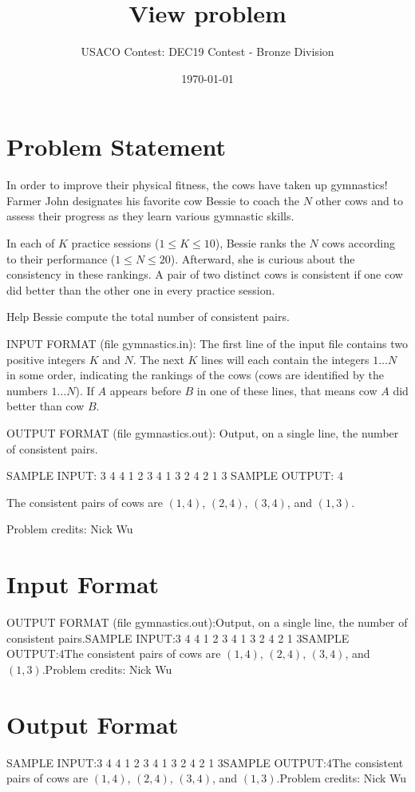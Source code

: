 \documentclass[12pt]{article}
\title{View problem}
\author{USACO Contest: DEC19 Contest - Bronze Division}
\date{\today}
\begin{document}
\maketitle

\section*{Problem Statement}

In order to improve their physical fitness, the cows have taken up gymnastics!
Farmer John designates his favorite cow Bessie to coach the $N$ other cows and
to assess their progress as they learn various gymnastic skills.

In each of $K$ practice sessions ($1 \leq K \leq 10$), Bessie ranks the $N$ cows according to their 
performance ($1 \leq N \leq 20$).  Afterward, she is curious about the consistency in these rankings.
A pair of two distinct cows is consistent if one cow did better than the
other one in every practice session.

Help Bessie compute the total number of consistent pairs.

INPUT FORMAT (file gymnastics.in):
The first line of the input file contains two positive integers $K$ and $N$. The next $K$ lines will each contain the
integers $1 \ldots N$ in some order, indicating the rankings of the cows (cows
are identified by the numbers $1 \ldots N$). If $A$ appears before $B$ in one of
these lines, that means cow $A$ did better than cow $B$.

OUTPUT FORMAT (file gymnastics.out):
Output, on a single line, the number of consistent pairs.

SAMPLE INPUT:
3 4
4 1 2 3
4 1 3 2
4 2 1 3
SAMPLE OUTPUT: 
4

The consistent pairs of cows are $(1,4)$, $(2,4)$, $(3,4)$, and $(1,3)$.


Problem credits: Nick Wu



\section*{Input Format}
OUTPUT FORMAT (file gymnastics.out):Output, on a single line, the number of consistent pairs.SAMPLE INPUT:3 4
4 1 2 3
4 1 3 2
4 2 1 3SAMPLE OUTPUT:4The consistent pairs of cows are $(1,4)$, $(2,4)$, $(3,4)$, and $(1,3)$.Problem credits: Nick Wu

\section*{Output Format}
SAMPLE INPUT:3 4
4 1 2 3
4 1 3 2
4 2 1 3SAMPLE OUTPUT:4The consistent pairs of cows are $(1,4)$, $(2,4)$, $(3,4)$, and $(1,3)$.Problem credits: Nick Wu
\end{document}
